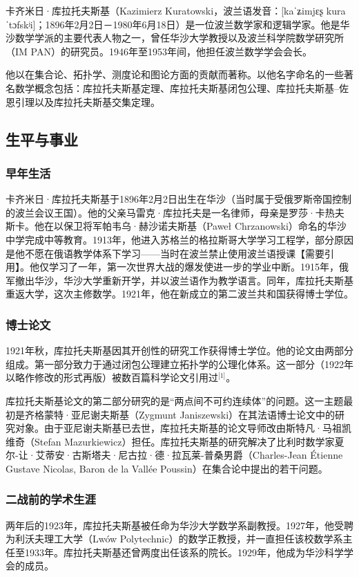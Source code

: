 
卡齐米日·库拉托夫斯基（Kazimierz Kuratowski，波兰语发音：[kaˈʑimjɛʂ kuraˈtɔfskʲi]；1896年2月2日－1980年6月18日）是一位波兰数学家和逻辑学家。他是华沙数学学派的主要代表人物之一，曾任华沙大学教授以及波兰科学院数学研究所（IM PAN）的研究员。1946年至1953年间，他担任波兰数学学会会长。

他以在集合论、拓扑学、测度论和图论方面的贡献而著称。以他名字命名的一些著名数学概念包括：库拉托夫斯基定理、库拉托夫斯基闭包公理、库拉托夫斯基–佐恩引理以及库拉托夫斯基交集定理。
\subsection{生平与事业}
\subsubsection{早年生活}
卡齐米日·库拉托夫斯基于1896年2月2日出生在华沙（当时属于受俄罗斯帝国控制的波兰会议王国）。他的父亲马雷克·库拉托夫是一名律师，母亲是罗莎·卡热夫斯卡。他在以保卫将军帕韦乌·赫沙诺夫斯基（Paweł Chrzanowski）命名的华沙中学完成中等教育。1913年，他进入苏格兰的格拉斯哥大学学习工程学，部分原因是他不愿在俄语教学体系下学习——当时在波兰禁止使用波兰语授课【需要引用】。他仅学习了一年，第一次世界大战的爆发使进一步的学业中断。1915年，俄军撤出华沙，华沙大学重新开学，并以波兰语作为教学语言。同年，库拉托夫斯基重返大学，这次主修数学。1921年，他在新成立的第二波兰共和国获得博士学位。
\subsubsection{博士论文}
1921年秋，库拉托夫斯基因其开创性的研究工作获得博士学位。他的论文由两部分组成。第一部分致力于通过闭包公理建立拓扑学的公理化体系。这一部分（1922年以略作修改的形式再版）被数百篇科学论文引用过\(^\text{[1]}\)。

库拉托夫斯基论文的第二部分研究的是“两点间不可约连续体”的问题。这一主题最初是齐格蒙特·亚尼谢夫斯基（Zygmunt Janiszewski）在其法语博士论文中的研究对象。由于亚尼谢夫斯基已去世，库拉托夫斯基的论文导师改由斯特凡·马祖凯维奇（Stefan Mazurkiewicz）担任。库拉托夫斯基的研究解决了比利时数学家夏尔-让·艾蒂安·古斯塔夫·尼古拉·德·拉瓦莱-普桑男爵（Charles-Jean Étienne Gustave Nicolas, Baron de la Vallée Poussin）在集合论中提出的若干问题。
\subsubsection{二战前的学术生涯}
两年后的1923年，库拉托夫斯基被任命为华沙大学数学系副教授。1927年，他受聘为利沃夫理工大学（Lwów Polytechnic）的数学正教授，并一直担任该校数学系主任至1933年。库拉托夫斯基还曾两度出任该系的院长。1929年，他成为华沙科学学会的成员。

